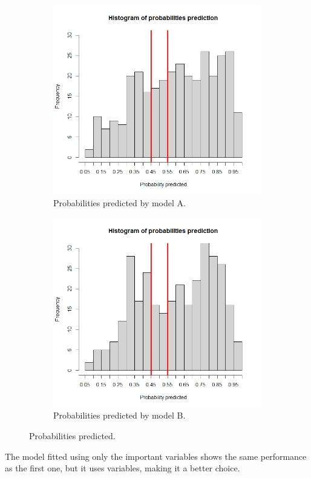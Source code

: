 \begin{figure}[H]
	\begin{subfigure}{.6\textwidth}
		\centering
		\includegraphics[width=0.7\linewidth]{ImageFiles/Classification/LogReg/probability_pred_all}
		\caption{Probabilities predicted by model A.}
		\label{fig:ProbPredA}
	\end{subfigure}
	\begin{subfigure}{.6\textwidth}
		\centering
		\includegraphics[width=0.7\linewidth]{ImageFiles/Classification/LogReg/probability_pred_imp}
		\caption{Probabilities predicted by model B.}
		\label{fig:ProbPredB}
	\end{subfigure}
	\caption{Probabilities predicted.}
	\label{fig:ProbPred}
\end{figure}

The model fitted using only the important variables shows the same performance as the first one, but it uses variables, making it a better choice.

